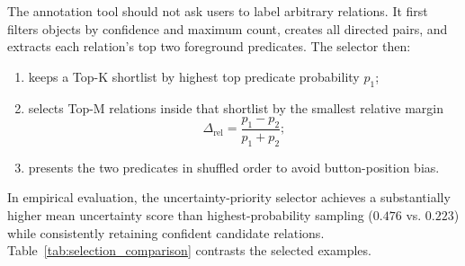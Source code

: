 \documentclass[10pt,twocolumn,letterpaper]{article}
\begin{document}
The annotation tool should not ask users to label arbitrary relations. It first filters objects by confidence and maximum count, creates all directed pairs, and extracts each relation's top two foreground predicates. The selector then:
\begin{enumerate}
    \item keeps a Top-K shortlist by highest top predicate probability $p_1$;
    \item selects Top-M relations inside that shortlist by the smallest relative margin
    \begin{equation}
        \Delta_{\mathrm{rel}} = \frac{p_1-p_2}{p_1+p_2};
    \end{equation}
    \item presents the two predicates in shuffled order to avoid button-position bias.
\end{enumerate}
In empirical evaluation, the uncertainty-priority selector achieves a substantially higher mean uncertainty score than highest-probability sampling ($0.476$ vs. $0.223$) while consistently retaining confident candidate relations. Table~\ref{tab:selection_comparison} contrasts the selected examples.

\begin{table}[t]
\centering
\footnotesize
\caption{\textbf{Selection comparison.} Uncertainty-priority selection keeps high-confidence relations but favors pairs whose top two predicates are close, producing more informative queries than ranking only by $p_1$.}
\label{tab:selection_comparison}
\setlength{\tabcolsep}{2.2pt}
\end{table}
\end{document}
